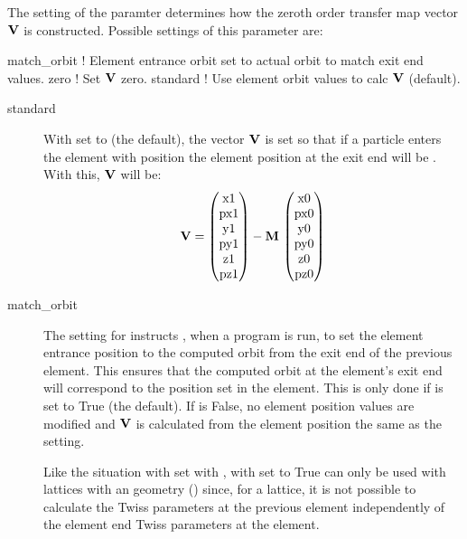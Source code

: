 {
The setting of the  paramter determines how the zeroth order transfer map vector ${\bf V}$ is
constructed. Possible settings of this parameter are:
\begin{example}
  match_orbit    ! Element entrance orbit set to actual orbit to match exit end values.
  zero           ! Set \({\bf V}\) zero.
  standard       ! Use element orbit values to calc \({\bf V}\) (default).
\end{example}
%
\begin{description} 
%
\item[standard] \Newline
With  set to  (the default), the vector ${\bf V}$ is set so that if a particle
enters the  element with position  the element position
at the exit end will be . With this, ${\bf V}$ will be:
\begin{equation}
  {\bf V} = 
    \begin{pmatrix} 
    \text{x1} \\ \text{px1} \\ \text{y1} \\ \text{py1} \\ \text{z1} \\ \text{pz1} 
    \end{pmatrix} -
    {\bf M} \, \begin{pmatrix} 
    \text{x0} \\ \text{px0} \\ \text{y0} \\ \text{py0} \\ \text{z0} \\ \text{pz0} 
    \end{pmatrix}
\end{equation}
%
\item[match_orbit] \Newline
The  setting for  instructs \bmad, when a program is run, to set the element
entrance position to the computed orbit from the exit end of the previous element. This ensures that
the computed orbit at the element's exit end will correspond to the position set in the
element. This is only done if  is set to True (the default). If  is False, no
element position values are modified and ${\bf V}$ is calculated from the element position the same as
the  setting.

Like the situation with  set with ,  with  set
to True can only be used with lattices with an  geometry () since, for a
 lattice, it is not possible to calculate the Twiss parameters at the previous element
independently of the element end Twiss parameters at the  element.


\end{description}}
